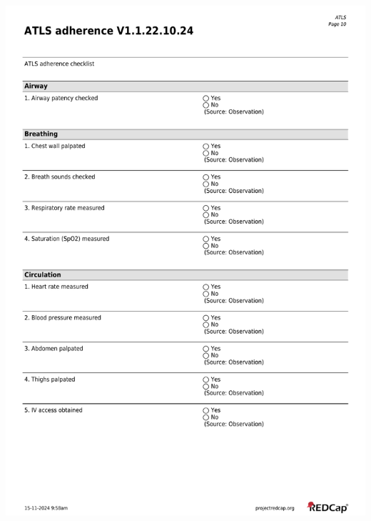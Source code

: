 \documentclass[
]{scrartcl}
\begin{document}
\includegraphics{../case-record-form/instrument-pdfs/pages/all-instruments-10.pdf}
\end{document}
